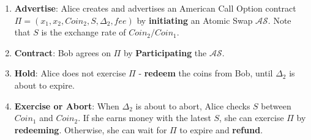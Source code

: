 \begin{enumerate}
    \item \textbf{Advertise}: Alice creates and advertises an American Call Option contract $\Pi = (x_1, x_2, Coin_2, S, \Delta_2, fee)$ by \textbf{initiating} an Atomic Swap $\mathcal{AS}$. Note that $S$ is the exchange rate of $Coin_2 / Coin_1$.
    \item \textbf{Contract}: Bob agrees on $\Pi$ by \textbf{Participating} the $\mathcal{AS}$.
    \item \textbf{Hold}: Alice does not exercise $\Pi$ - \textbf{redeem} the coins from Bob, until $\Delta_2$ is about to expire.
    \item \textbf{Exercise or Abort}: When $\Delta_2$ is about to abort, Alice checks $S$ between $Coin_1$ and $Coin_2$. If she earns money with the latest $S$, she can exercise $\Pi$ by \textbf{redeeming}. Otherwise, she can wait for $\Pi$ to expire and \textbf{refund}.
\end{enumerate}